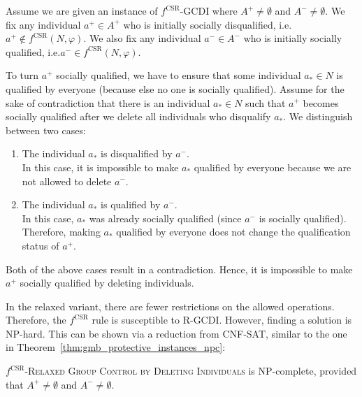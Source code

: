 \documentclass[
    12pt,               %
    a4paper,            %
    bibtotoc,           %
    pointlessnumbers,   %
    ngerman,            %
    titlepage,          %
    leqno,              %
    ]{scrarticle}       %
\newcommand\thmref{Theorem~\ref}
\begin{document}
\begin{Proof}
Assume we are given an instance of $f^{\text{CSR}}$-GCDI where $A^+ \neq \emptyset$ and $A^- \neq \emptyset$. We fix any individual $a^+ \in A^+$ who is initially socially disqualified, i.e.\@ $a^+ \not\in f^{\text{CSR}}(N, \varphi)$. We also fix any individual $a^- \in A^-$ who is initially socially qualified, i.e.\@ $a^- \in f^{\text{CSR}}(N, \varphi)$. 

To turn $a^+$ socially qualified, we have to ensure that some individual $a_\ast \in N$ is qualified by everyone (because else no one is socially qualified). Assume for the sake of contradiction that there is an individual $a_\ast \in N$ such that $a^+$ becomes socially qualified after we delete all individuals who disqualify $a_\ast$. We distinguish between two cases:

\begin{enumerate}[
    leftmargin=*,
    label={\textit{Case \ref*{obs:csr_immune_gcdi}.\arabic*}:},
    nolistsep
]
\item
The individual $a_\ast$ is disqualified by $a^-$. \\
In this case, it is impossible to make $a_\ast$ qualified by everyone because we are not allowed to delete $a^-$.
\item
The individual $a_\ast$ is qualified by $a^-$. \\
In this case, $a_\ast$ was already socially qualified (since $a^-$ is socially qualified). Therefore, making $a_\ast$ qualified by everyone does not change the qualification status of $a^+$.
\end{enumerate}

Both of the above cases result in a contradiction. Hence, it is impossible to make $a^+$ socially qualified by deleting individuals.
\end{Proof}



In the relaxed variant, there are fewer restrictions on the allowed operations. Therefore, the $f^{\text{CSR}}$ rule is susceptible to R-GCDI. However, finding a solution is NP-hard. This can be shown via a reduction from CNF-SAT, similar to the one in \thmref{thm:gmb_protective_instances_npc}:

\begin{Theorem} \label{thm:csr_rgcdi_npc}
$f^{\text{CSR}}$-\textsc{Relaxed Group Control by Deleting Individuals} is NP-complete, provided that $A^+ \neq \emptyset$ and $A^- \neq \emptyset$.
\end{Theorem}
\end{document}

